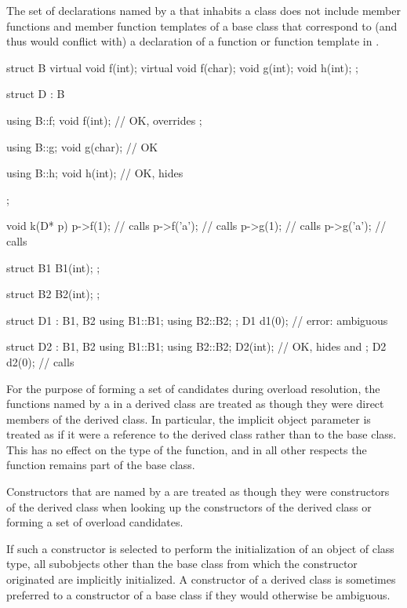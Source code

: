 \pnum
{}%
The set of declarations named by a 
that inhabits a class  does not include
member functions and member function templates of a base class
that correspond to (and thus would conflict with)
a declaration of a function or function template in .
\begin{example}
\begin{codeblock}
struct B {
  virtual void f(int);
  virtual void f(char);
  void g(int);
  void h(int);
};

struct D : B {
  using B::f;
  void f(int);      // OK,  overrides ;

  using B::g;
  void g(char);     // OK

  using B::h;
  void h(int);      // OK,  hides 
};

void k(D* p)
{
  p->f(1);          // calls 
  p->f('a');        // calls 
  p->g(1);          // calls 
  p->g('a');        // calls 
}

struct B1 {
  B1(int);
};

struct B2 {
  B2(int);
};

struct D1 : B1, B2 {
  using B1::B1;
  using B2::B2;
};
D1 d1(0);           // error: ambiguous

struct D2 : B1, B2 {
  using B1::B1;
  using B2::B2;
  D2(int);          // OK,  hides  and 
};
D2 d2(0);           // calls 
\end{codeblock}
\end{example}

\pnum
{}%
\begin{note}
For the purpose of forming a set of candidates during overload resolution,
the functions
named by a  in a derived class
are treated as though they were direct members of the derived class. In
particular, the implicit object parameter is treated as if
it were a reference to the derived class rather than to the base class.
This has no effect on the type of the function, and in all other
respects the function remains part of the base class.
\end{note}

\pnum
Constructors that are named by a 
are treated as though they were constructors of the derived class
when looking up the constructors of the derived class
or forming a set of overload candidates.
\begin{note}
If such a constructor is selected to perform the initialization
of an object of class type, all subobjects other than the base class
from which the constructor originated
are implicitly initialized.
A constructor of a derived class is sometimes preferred to a constructor of a base class
if they would otherwise be ambiguous.
\end{note}

